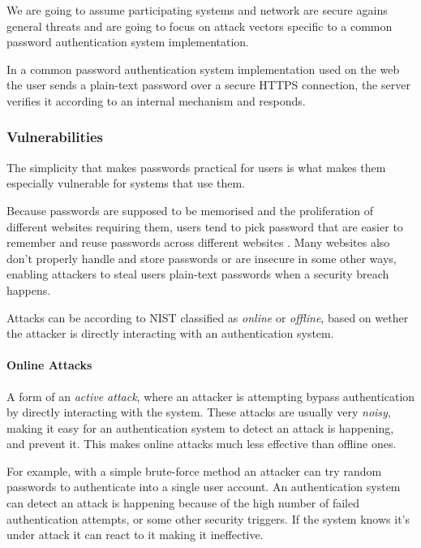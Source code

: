 We are going to assume participating systems and network are secure agains general threats and are going to focus on attack vectors specific to a common password authentication system implementation.

In a common password authentication system implementation used on the web the user sends a plain-text password over a secure HTTPS connection, the server verifies it according to an internal mechanism and responds.


\subsubsection{Vulnerabilities}
\label{label:password-vulnerabilities}

The simplicity that makes passwords practical for users is what makes them especially vulnerable for systems that use them.

Because passwords are supposed to be memorised and the proliferation of different websites requiring them, users tend to pick password that are easier to remember and reuse passwords across different websites \cite{conklin2004password}.
Many websites also don't properly handle and store passwords or are insecure in some other ways, enabling attackers to steal users plain-text passwords when a security breach happens.

Attacks can be according to NIST \cite{grassi2017} classified as \textit{online} or \textit{offline}, based on wether the attacker is directly interacting with an authentication system.

\paragraph{Online Attacks} A form of an \textit{active attack}, where an attacker is attempting bypass authentication by directly interacting with the system.
These attacks are usually very \textit{noisy}, making it easy for an authentication system to detect an attack is happening, and prevent it.
This makes online attacks much less effective than offline ones.

For example, with a simple brute-force method an attacker can try random passwords to authenticate into a single user account.
An authentication system can detect an attack is happening because of the high number of failed authentication attempts, or some other security triggers. If the system knows it's under attack it can react to it making it ineffective.

